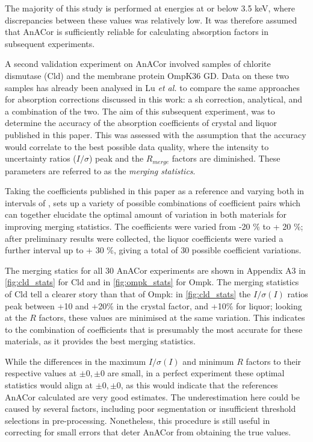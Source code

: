 The majority of this study is performed at energies at or below 3.5 \unit{keV}, where discrepancies between these values was relatively low. It was therefore assumed that AnACor is sufficiently reliable for calculating absorption factors in subsequent experiments.%

A second validation experiment on AnACor involved samples of chlorite dismutase (Cld) and the membrane protein OmpK36 GD. Data on these two samples has already been analysed in Lu \textit{et al.} \cite{Lu2024} to compare the same approaches for absorption corrections discussed in this work: a \ac{sh} correction, analytical, and a combination of the two. The aim of this subsequent experiment, was to determine the accuracy of the absorption coefficients of crystal and liquor published in this paper. This was assessed with the assumption that the accuracy would correlate to the best possible data quality, where the intensity to uncertainty ratios ($I / \sigma$) peak and the $R_{merge}$ factors are diminished. These parameters are referred to as the \textit{merging statistics}.

Taking the coefficients published in this paper as a reference and varying both in intervals of , sets up a variety of possible combinations of coefficient pairs which can together elucidate the optimal amount of variation in both materials for improving merging statistics. The coefficients were varied from -20 \% to + 20 \%; after preliminary results were collected, the liquor coefficients were varied a further interval up to + 30 \%, giving a total of 30 possible coefficient variations. %

The merging statics for all 30 AnACor experiments are shown in Appendix A3 in \cref{fig:cld_stats} for Cld and in \cref{fig:ompk_stats} for Ompk. The merging statistics of Cld tell a clearer story than that of Ompk: in \cref{fig:cld_stats} the $I/\sigma(I)$ ratios peak between +10 and +20\% in the crystal factor, and +10\% for liquor; looking at the $R$ factors, these values are minimised at the same variation. This indicates to the combination of coefficients that is presumably the most accurate for these materials, as it provides the best merging statistics.

While the differences in the maximum $I/\sigma(I)$ and minimum $R$ factors to their respective values at $\pm0,\pm0$ are small, in a perfect experiment these optimal statistics would align at $\pm0,\pm0$, as this would indicate that the references AnACor calculated are very good estimates. The underestimation here could be caused by several factors, including poor segmentation or insufficient threshold selections in pre-processing. Nonetheless, this procedure is still useful in correcting for small errors that deter AnACor from obtaining the true values. 

